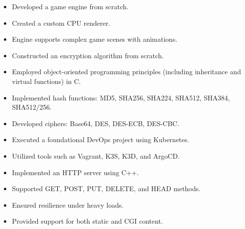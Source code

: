 
\begin{multicols}{2} %
    \begin{itemize}
        \item Developed a game engine from scratch.
        \item Created a custom CPU renderer.
        \item Engine supports complex game scenes with animations.
    \end{itemize}

    \begin{itemize}
        \item Constructed an encryption algorithm from scratch.
        \item Employed object-oriented programming principles (including inheritance and virtual functions) in C.
        \item Implemented hash functions: MD5, SHA256, SHA224, SHA512, SHA384, SHA512/256.
        \item Developed ciphers: Base64, DES, DES-ECB, DES-CBC.
    \end{itemize}
    
    \begin{itemize}
        \item Executed a foundational DevOps project using Kubernetes.
        \item Utilized tools such as Vagrant, K3S, K3D, and ArgoCD.
    \end{itemize}
    
\columnbreak
    \begin{itemize}
        \item Implemented an HTTP server using C++.
        \item Supported GET, POST, PUT, DELETE, and HEAD methods.
        \item Ensured resilience under heavy loads.
        \item Provided support for both static and CGI content.
    \end{itemize}


\end{multicols}

